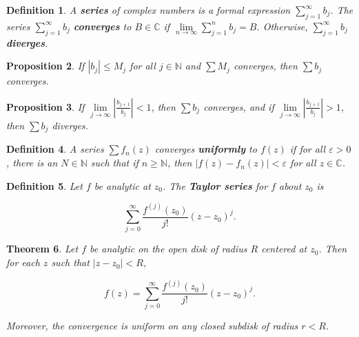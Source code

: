 \documentclass{article}
\theoremstyle{colontheorem}
\newtheorem{theorem}{Theorem}[section]
\newtheorem{proposition}[theorem]{Proposition}
\newtheorem{definition}[theorem]{Definition}
\newenvironment{Theorem}
{
	\begin{mdframed}[backgroundcolor=TheoremOrange!10]
	\begin{theorem}
}
{
	\end{theorem}
	\end{mdframed}
	
	\vspace{.15in}
}
\newenvironment{Proposition}
{
	\begin{mdframed}[backgroundcolor=TheoremOrange!10]
	\begin{proposition}
}
{
	\end{proposition}
	\end{mdframed}
	
	\vspace{.15in}
}
\newenvironment{Def}
{
	\begin{mdframed}[backgroundcolor=DefGreen!10]
	\begin{definition}
}
{
	\end{definition}
	\end{mdframed}
	
	\vspace{.15in}
}
\begin{document}
\begin{Def}
	
	A \textbf{series} of complex numbers is a formal expression $\displaystyle\sum\limits_{j=1}^\infty b_j$. The series $\displaystyle\sum\limits_{j=1}^\infty b_j$ \textbf{converges} to $B \in \mathbb{C}$ if $\lim\limits_{n \to \infty} \displaystyle\sum\limits_{j=1}^n b_j = B$. Otherwise, $\displaystyle\sum\limits_{j=1}^\infty b_j$ \textbf{diverges}.
	
\end{Def}



\begin{Proposition}
	
	If $|b_j| \leq M_j$ for all $j \in \mathbb{N}$ and $\displaystyle\sum M_j$ converges, then $\displaystyle\sum b_j$ converges.
	
\end{Proposition}



\begin{Proposition}
	
	If $\lim\limits_{j \to \infty} \left| \frac{b_{j+1}}{b_j} \right| < 1$, then $\displaystyle\sum b_j$ converges, and if $\lim\limits_{j \to \infty} \left| \frac{b_{j+1}}{b_j} \right| > 1$, then $\displaystyle\sum b_j$ diverges.
	
\end{Proposition}



\begin{Def}
	
	A series $\displaystyle\sum f_n(z)$ converges \textbf{uniformly} to $f(z)$ if for all $\varepsilon > 0$, there is an $N \in \mathbb{N}$ such that if $n \geq \mathbb{N}$, then $|f(z) - f_n(z)| < \varepsilon$ for all $z \in \mathbb{C}$.
	
\end{Def}



\begin{Def}
	
	Let $f$ be analytic at $z_0$. The \textbf{Taylor series} for $f$ about $z_0$ is
	
	$$
		\sum\limits_{j=0}^\infty \frac{f^{(j)}(z_0)}{j!} (z - z_0)^j.
	$$
	
\end{Def}



\begin{Theorem}
	
	Let $f$ be analytic on the open disk of radius $R$ centered at $z_0$. Then for each $z$ such that $|z - z_0| < R$,
	
	$$
		f(z) = \sum\limits_{j=0}^\infty \frac{f^{(j)}(z_0)}{j!} (z - z_0)^j.
	$$
	
	Moreover, the convergence is uniform on any closed subdisk of radius $r < R$.
	
\end{Theorem}
\end{document}
